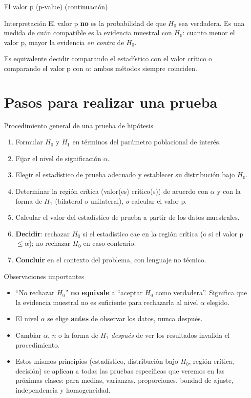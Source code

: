 \documentclass[aspectratio=169,11pt]{beamer}
\begin{document}
\begin{frame}{El valor p (p-value) (continuación)}
\begin{alertblock}{Interpretación}
El valor p \textbf{no} es la probabilidad de que $H_0$ sea verdadera. Es una medida de cuán compatible es la evidencia muestral con $H_0$: cuanto menor el valor p, mayor la evidencia \emph{en contra} de $H_0$.
\end{alertblock}

Es equivalente decidir comparando el estadístico con el valor crítico o comparando el valor p con $\alpha$: ambos métodos siempre coinciden.
\end{frame}

\section{Pasos para realizar una prueba}

\begin{frame}{Procedimiento general de una prueba de hipótesis}
\begin{enumerate}
\item Formular $H_0$ y $H_1$ en términos del parámetro poblacional de interés.
\item Fijar el nivel de significación $\alpha$.
\item Elegir el estadístico de prueba adecuado y establecer su distribución bajo $H_0$.
\item Determinar la región crítica (valor(es) crítico(s)) de acuerdo con $\alpha$ y con la forma de $H_1$ (bilateral o unilateral), \emph{o} calcular el valor p.
\item Calcular el valor del estadístico de prueba a partir de los datos muestrales.
\item \textbf{Decidir}: rechazar $H_0$ si el estadístico cae en la región crítica (o si el valor p $\le \alpha$); no rechazar $H_0$ en caso contrario.
\item \textbf{Concluir} en el contexto del problema, con lenguaje no técnico.
\end{enumerate}
\end{frame}

\begin{frame}{Observaciones importantes}
\begin{itemize}
\item ``No rechazar $H_0$'' \textbf{no equivale} a ``aceptar $H_0$ como verdadera''. Significa que la evidencia muestral no es suficiente para rechazarla al nivel $\alpha$ elegido.
\item El nivel $\alpha$ se elige \textbf{antes} de observar los datos, nunca después.
\item Cambiar $\alpha$, $n$ o la forma de $H_1$ \emph{después} de ver los resultados invalida el procedimiento.
\item Estos mismos principios (estadístico, distribución bajo $H_0$, región crítica, decisión) se aplican a todas las pruebas específicas que veremos en las próximas clases: para medias, varianzas, proporciones, bondad de ajuste, independencia y homogeneidad.
\end{itemize}
\end{frame}
\end{document}

